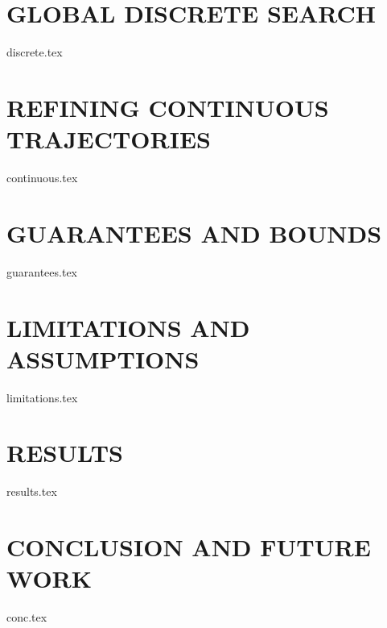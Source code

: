 \documentclass[letterpaper, 10 pt, conference]{ieeeconf}  %
\begin{document}
\section{GLOBAL DISCRETE SEARCH} \label{sec:4_dis}
{discrete.tex}

\section{REFINING CONTINUOUS TRAJECTORIES} \label{sec:5_cont}
{continuous.tex}

\section{GUARANTEES AND BOUNDS} \label{sec:6_guar}
{guarantees.tex}

\section{LIMITATIONS AND ASSUMPTIONS} \label{sec:7_limit}
{limitations.tex}

\section{RESULTS}  \label{sec:8_results}
{results.tex}

\section{CONCLUSION AND FUTURE WORK}  \label{sec:9_fw}
{conc.tex}

\addtolength{\textheight}{-12cm}   %




\end{document}
